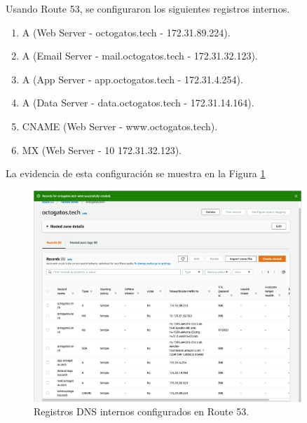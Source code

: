 \documentclass{article}
\begin{document}
Usando Route 53, se configuraron los siguientes
registros internos.
\begin{enumerate}
  \item A (Web Server - octogatos.tech - 172.31.89.224).

  \item A (Email Server - mail.octogatos.tech - 172.31.32.123).

  \item A (App Server - app.octogatos.tech - 172.31.4.254).

  \item A (Data Server - data.octogatos.tech - 172.31.14.164).

  \item CNAME (Web Server - www.octogatos.tech).

  \item MX (Web Server - 10 172.31.32.123).
\end{enumerate}
La evidencia de esta configuraci\'on se muestra en
la Figura \ref{fig:createdRecord}
\begin{figure}[H]
  \centering
  \includegraphics[width=0.9\textwidth]{DNS/createdRecord}
  \caption{Registros DNS internos configurados en Route 53.}
  \label{fig:createdRecord}
\end{figure}

\end{document}
